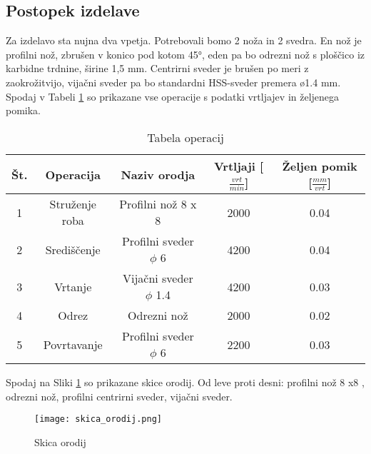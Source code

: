 \subsection{Postopek izdelave}
Za izdelavo sta nujna dva vpetja. Potrebovali bomo 2 noža in 2
svedra. En nož je profilni nož, zbrušen v konico pod kotom 45°, eden pa
bo odrezni nož s ploščico iz karbidne trdnine, širine 1,5 mm.
Centrirni sveder je brušen po meri z zaokrožitvijo, vijačni
sveder pa bo standardni HSS-sveder premera ø1.4 mm. Spodaj v Tabeli \ref{tabela_operacij}
so prikazane vse operacije s podatki vrtljajev in željenega pomika.

\begin{table}[H]
	\caption{Tabela operacij}
	\label{tabela_operacij}
	\begin{center}
		\begin{tabular}{|c|c|c|c|c|}
			\hline
			Št. & Operacija      & Naziv orodja              & Vrtljaji [\( \frac{vrt}{min}\)] & Željen pomik [\( \frac{mm}{vrt}\)] \\
			\hline
			1   & Struženje roba & Profilni nož 8 x 8          & 2000                            & 0.04                               \\
			\hline
			2   & Središčenje    & Profilni sveder $\phi$ 6  & 4200                            & 0.04                               \\
			\hline
			3   & Vrtanje        & Vijačni sveder $\phi$ 1.4 & 4200                            & 0.03                               \\
			\hline
			4   & Odrez          & Odrezni nož               & 2000                            & 0.02                               \\
			\hline
			5   & Povrtavanje    & Profilni sveder $\phi$ 6  & 2200                            & 0.03                               \\
			\hline
		\end{tabular}
	\end{center}

\end{table}

Spodaj na Sliki \ref{skica_orodij} so prikazane skice orodij.  Od leve proti desni: profilni nož 8 x8 ,
odrezni nož, profilni centrirni sveder, vijačni sveder.

\begin{figure}[H]
	\begin{center}
		\texttt{[image: skica\_orodij.png]}
		\caption{Skica orodij
			\cite{lasten}}
		\label{skica_orodij}
	\end{center}
\end{figure}

